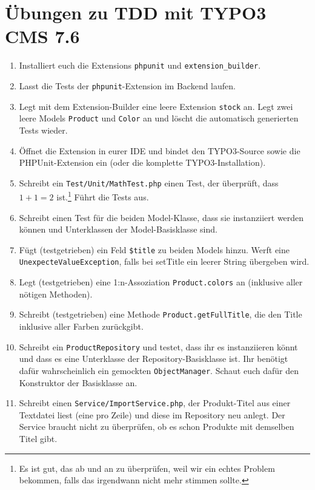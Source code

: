 \documentclass[a4paper,12pt]{scrartcl}
\begin{document}
\raggedbottom

\section*{Übungen zu TDD mit TYPO3 CMS 7.6}

\begin{enumerate}
  \item Installiert euch die Extensions \texttt{phpunit} und \texttt{extension\_builder}.
  
  \item Lasst die Tests der \texttt{phpunit}-Extension im Backend laufen.
  
  \item Legt mit dem Extension-Builder eine leere Extension \texttt{stock} an. Legt zwei leere Models \texttt{Product} und \texttt{Color} an und löscht die automatisch generierten Tests wieder.
  
  \item Öffnet die Extension in eurer IDE und bindet den TYPO3-Source sowie die PHPUnit-Extension ein (oder die komplette TYPO3-Installation).
  
  \item Schreibt ein \texttt{Test/Unit/MathTest.php} einen Test, der überprüft, dass $1 + 1 = 2$ ist.\footnote{Es ist gut, das ab und an zu überprüfen, weil wir ein echtes Problem bekommen, falls das irgendwann nicht mehr stimmen sollte.} Führt die Tests aus.
  
  \item Schreibt einen Test für die beiden Model-Klasse, dass sie instanziiert werden können und Unterklassen der Model-Basisklasse sind.
  
  \item Fügt (testgetrieben) ein Feld \texttt{\$title} zu beiden Models hinzu. Werft eine \texttt{UnexpecteValueException}, falls bei setTitle ein leerer String übergeben wird.
  
  \item Legt (testgetrieben) eine 1:n-Assoziation \texttt{Product.colors} an (inklusive aller nötigen Methoden).
  
  \item Schreibt (testgetrieben) eine Methode \texttt{Product.getFullTitle}, die den Title inklusive aller Farben zurückgibt.
  
  \item Schreibt ein \texttt{ProductRepository} und testet, dass ihr es instanziieren könnt und dass es eine Unterklasse der Repository-Basisklasse ist. Ihr benötigt dafür wahrscheinlich ein gemockten \texttt{ObjectManager}. Schaut euch dafür den Konstruktor der Basisklasse an.
  
  \item Schreibt einen \texttt{Service/ImportService.php}, der Produkt-Titel aus einer Textdatei liest (eine pro Zeile) und diese im Repository neu anlegt. Der Service braucht nicht zu überprüfen, ob es schon Produkte mit demselben Titel gibt.
 
\end{enumerate}
\end{document}
